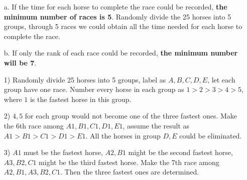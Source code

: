 \documentclass{assignment}
\begin{document}
    
    \begin{homeworkProblem}
    \begin{enumerate}
\item[a.] If the time for each horse to complete the race could be recorded, \textbf{the minimum number of races is 5}. Randomly divide the 25 horses into 5 groups, through 5 races we could obtain all the time needed for each horse to complete the race.
\item[b.] If only the rank of each race could be recorded, \textbf{the minimum number will be 7}.

1) Randomly divide 25 horses into 5 groups, label as $A,B,C,D,E$, let each group have one race. Number every horse in each group as $1>2>3>4>5$, where $1$ is the fastest horse in this group.

2) $4,5$ for each group would not become one of the  three fastest ones. Make the 6th race among $A1,B1,C1,D1,E1$, assume the result as $A1>B1>C1>D1>E1$. All the horses in group $D,E$ could be eliminated.

3) $A1$ must be the fastest horse, $A2, B1$ might be the second fastest horse, $A3, B2,C1$ might be the third fastest horse. Make the 7th race among $A2, B1, A3, B2,C1$. Then the three fastest ones are determined. 
    \end{enumerate}
    \end{homeworkProblem}
    
\end{document}
